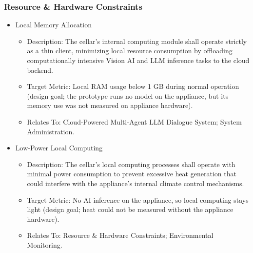 \documentclass[conference]{IEEEtran}
\begin{document}
\subsubsection{Resource \& Hardware Constraints}
\begin{itemize}
    \item Local Memory Allocation
    \begin{itemize}
        \item Description: The cellar's internal computing module shall operate strictly as a thin client, minimizing local resource consumption by offloading computationally intensive Vision AI and LLM inference tasks to the cloud backend.
        \item Target Metric: Local RAM usage below 1 GB during normal operation (design goal; the prototype runs no model on the appliance, but its memory use was not measured on appliance hardware).
        \item Relates To: Cloud-Powered Multi-Agent LLM Dialogue System; System Administration.
    \end{itemize}

    \item Low-Power Local Computing
    \begin{itemize}
        \item Description: The cellar's local computing processes shall operate with minimal power consumption to prevent excessive heat generation that could interfere with the appliance's internal climate control mechanisms.
        \item Target Metric: No AI inference on the appliance, so local computing stays light (design goal; heat could not be measured without the appliance hardware).
        \item Relates To: Resource \& Hardware Constraints; Environmental Monitoring.
    \end{itemize}
\end{itemize}
\end{document}
